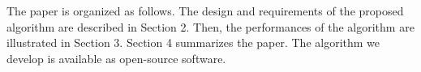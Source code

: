 The paper is organized as follows. The design and requirements of the proposed algorithm are described in Section 2. Then, the performances of the algorithm are illustrated in Section 3. Section 4 summarizes the paper. The algorithm we develop is available as open-source software.

